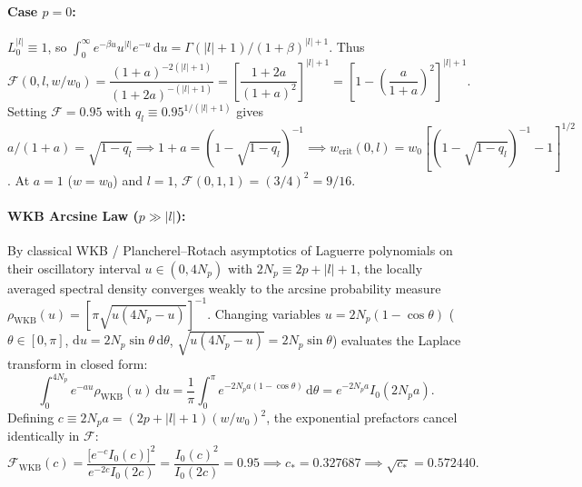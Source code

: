 \documentclass[10pt,letterpaper]{article}
\newcommand{\abs}[1]{\lvert #1 \rvert}
\newcommand{\dd}{\mathrm{d}}
\numberwithin{equation}{section}
\begin{document}
\paragraph*{Case $p = 0$:} $L_0^{\abs{l}} \equiv 1$, so $\int_0^\infty e^{-\beta u} u^{\abs{l}} e^{-u}\,\dd u = \Gamma(\abs{l}+1)/(1+\beta)^{\abs{l}+1}$. Thus
\begin{equation}
  \mathcal{F}(0,l,w/w_0) = \frac{(1+a)^{-2(\abs{l}+1)}}{(1+2a)^{-(\abs{l}+1)}} = \left[\frac{1+2a}{(1+a)^2}\right]^{\abs{l}+1} = \left[1 - \left(\frac{a}{1+a}\right)^2\right]^{\abs{l}+1}.
\end{equation}
Setting $\mathcal{F} = 0.95$ with $q_l \equiv 0.95^{1/(\abs{l}+1)}$ gives $a/(1+a) = \sqrt{1-q_l} \implies 1 + a = (1 - \sqrt{1-q_l})^{-1} \implies w_{\mathrm{crit}}(0,l) = w_0[(1-\sqrt{1-q_l})^{-1} - 1]^{1/2}$. At $a = 1$ ($w=w_0$) and $l = 1$, $\mathcal{F}(0,1,1) = (3/4)^2 = 9/16$.

\paragraph*{WKB Arcsine Law ($p \gg \abs{l}$):} By classical WKB / Plancherel--Rotach asymptotics of Laguerre polynomials on their oscillatory interval $u \in (0, 4N_p)$ with $2N_p \equiv 2p + \abs{l} + 1$, the locally averaged spectral density converges weakly to the arcsine probability measure $\rho_{\mathrm{WKB}}(u) = [\pi\sqrt{u(4N_p - u)}]^{-1}$. Changing variables $u = 2N_p(1 - \cos\theta)$ ($\theta \in [0,\pi]$, $\dd u = 2N_p\sin\theta\,\dd\theta$, $\sqrt{u(4N_p-u)} = 2N_p\sin\theta$) evaluates the Laplace transform in closed form:
\begin{equation}
  \int_0^{4N_p} e^{-a u}\rho_{\mathrm{WKB}}(u)\,\dd u = \frac{1}{\pi}\int_0^\pi e^{-2N_p a(1 - \cos\theta)}\,\dd\theta = e^{-2N_p a} I_0(2N_p a).
\end{equation}
Defining $c \equiv 2N_p a = (2p+\abs{l}+1)(w/w_0)^2$, the exponential prefactors cancel identically in $\mathcal{F}$:
\begin{equation}
  \mathcal{F}_{\mathrm{WKB}}(c) = \frac{\bigl[e^{-c} I_0(c)\bigr]^2}{e^{-2c} I_0(2c)} = \frac{I_0(c)^2}{I_0(2c)} = 0.95 \implies c_* = 0.327687 \implies \sqrt{c_*} = 0.572440.
\end{equation}
\end{document}

